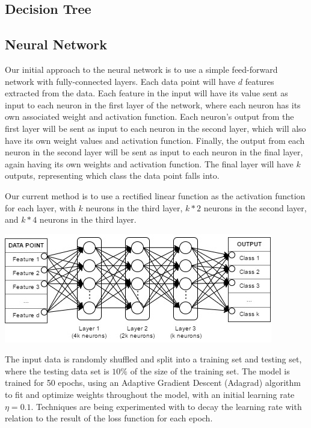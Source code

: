 \documentclass[letter,10pt]{article}
\begin{document}
\begin{multicols}{2}
		\subsection{Decision Tree}
		\subsection{Neural Network}
		\par
		Our initial approach to the neural network is to use a simple feed-forward network with fully-connected layers. Each data point will have \(d\) features extracted from the data. Each feature in the input will have its value sent as input to each neuron in the first layer of the network, where each neuron has its own associated weight and activation function. Each neuron's output from the first layer will be sent as input to each neuron in the second layer, which will also have its own weight values and activation function. Finally, the output from each neuron in the second layer will be sent as input to each neuron in the final layer, again having its own weights and activation function. The final layer will have \(k\) outputs, representing which class the data point falls into.
		\par
		Our current method is to use a rectified linear function as the activation function for each layer, with \(k\) neurons in the third layer, \(k*2\) neurons in the second layer, and \(k*4\) neurons in the third layer.
		\begin{center}
			\includegraphics[scale=0.5]{NeuralNet/Network} \\
			\label{fig:nn_10_class_results}
		\end{center}
		The input data is randomly shuffled and split into a training  set and testing set, where the testing data set is \(10\%\) of the size of the training set.
		The model is trained for 50 epochs, using an Adaptive Gradient Descent (Adagrad) algorithm to fit and optimize weights throughout the model, with an initial learning rate \(\eta = 0.1\). Techniques are being experimented with to decay the learning rate with relation to the result of the loss function for each epoch.

\end{multicols}
\end{document}
